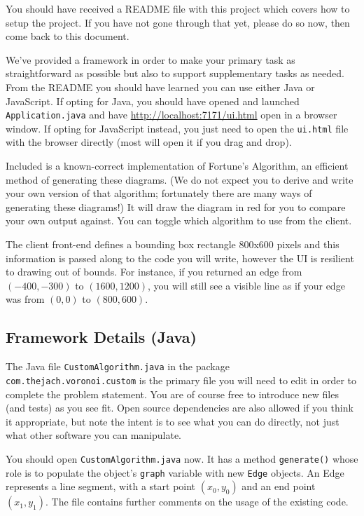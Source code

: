 \documentclass[12pt]{article}
\begin{document}
You should have received a README file with this project which covers how to
setup the project. If you have not gone through that yet, please do so now, then
come back to this document.

We've provided a framework in order to make your primary task as straightforward as
possible but also to support supplementary tasks as needed. From the README you
should have learned you can use either Java or JavaScript. If opting for Java,
you should have opened and launched \texttt{Application.java} and have \url{http://localhost:7171/ui.html}
open in a browser window. If opting for JavaScript instead, you just need to
open the \texttt{ui.html} file with the browser directly (most will open it if
you drag and drop).

Included is a known-correct implementation of Fortune's Algorithm, an
efficient method of generating these diagrams. (We do not expect you
to derive and write your own version of that algorithm; fortunately there are
many ways of generating these diagrams!) It will draw the diagram in red for
you to compare your own output against. You can toggle which algorithm to use
from the client.

The client front-end defines a bounding box rectangle 800x600 pixels and this
information is passed along to the code you will write, however the UI is resilient
to drawing out of bounds. For instance,
if you returned an edge from $(-400, -300)$ to $(1600,1200)$, you will still see
a visible line as if your edge was from $(0,0)$ to $(800,600)$.

\subsection*{Framework Details (Java)}

The Java file \texttt{CustomAlgorithm.java} in the package
\texttt{com.thejach.voronoi.custom} is the primary file you will need to edit in
order to complete the problem statement. You are of course free to introduce new
files (and tests) as you see fit. Open source dependencies are also allowed if
you think it appropriate, but note the intent is to see what you can do directly,
not just what other software you can manipulate.

You should open \texttt{CustomAlgorithm.java} now. It has a method \texttt{generate()}
whose role is to populate the object's \texttt{graph} variable with new \texttt{Edge} objects.
An Edge represents a line segment, with a start point $(x_0, y_0)$ and an end point
$(x_1, y_1)$.
The file contains further comments on the usage of the existing code.
\end{document}
